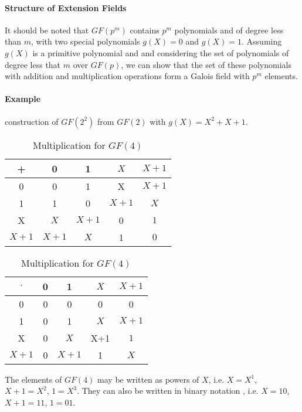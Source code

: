 \documentclass[fontsize=12pt]{article}
\begin{document}
 \paragraph{Structure of Extension Fields}
 It should be noted that $GF(p^m)$ contains $p^m$ polynomials and of degree less than $m$, with two special polynomials $g(X)=0$ and $g(X)=1$. Assuming $g(X)$ is a primitive polynomial and  and considering the set of polynomials of degree less that $m$ over $GF(p)$, we can show that the set of these polynomials with addition and multiplication operations form a Galois field with $p^m$ elements.
 \newpage
 \paragraph{Example}construction of $GF(2^2)$ from $GF(2)$ with $g(X)=X^2 + X + 1$.\\ 
 
 \begin{table}[h]

\centering
\begin{tabular}{ |c||c|c|c|c| } 
 \hline
 
 + &0 & 1 & $X$ & $X+1$\\
 \hline 
  \hline 
 0 &0 & 1 & X & $X+1$\\ 
  \hline 
 1 &1 & 0 & $X+1$ & $X$ \\ 
  \hline 
 X &$X$& $X+1$ & 0 & $1$ \\ 
  \hline 
 $X+1$ &$X+1$ & $X$ & 1 & $0$ \\ 
 \hline
 
\end{tabular}
\caption{Addition for $GF(4)$}

\centering
\begin{tabular}{ |c||c|c|c|c| } 
 \hline
 
 $\cdot$ &0 & 1 & $X$ & $X+1$\\
 \hline 
  \hline 
 0 &0 & 0 & 0 & 0\\ 
  \hline 
 1 &0 & 1 & $X$ & $X+1$ \\ 
  \hline 
 X &0& $X$ & X+1 & $1$ \\ 
  \hline 
 $X+1$ & 0 & $X+1$ & 1 & $X$ \\ 
 \hline
\end{tabular}
\caption{Multiplication for $GF(4)$}

\end{table}
 The elements of $GF(4)$ may be written as powers of $X$, i.e.  $X=X^1$, $X+1=X^2$, $1=X^3$. They can also be written in binary notation ,  i.e.  $X=10$, $X+1=11$, $1=01$.
 
\end{document}
